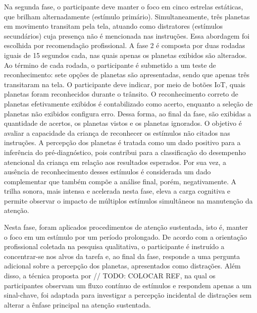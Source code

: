 Na segunda fase, o participante deve manter o foco em cinco estrelas estáticas, que brilham alternadamente (estímulo primário). Simultaneamente, três planetas em movimento transitam pela tela, atuando como distratores (estímulos secundários) cuja presença não é mencionada nas instruções. Essa abordagem foi escolhida por recomendação profissional. A fase 2 é composta por duas rodadas iguais de 15 segundos cada, nas quais apenas os planetas exibidos são alterados. Ao término de cada rodada, o participante é submetido a um teste de reconhecimento: sete opções de planetas são apresentadas, sendo que apenas três transitaram na tela. O participante deve indicar, por meio de botões IoT, quais planetas foram reconhecidos durante o trânsito. O reconhecimento correto de planetas efetivamente exibidos é contabilizado como acerto, enquanto a seleção de planetas não exibidos configura erro. Dessa forma, ao final da fase, são exibidas a quantidade de acertos, os planetas vistos e os planetas ignorados. O objetivo é avaliar a capacidade da criança de reconhecer os estímulos não citados nas instruções. A percepção dos planetas é tratada como um dado positivo para a inferência do pré-diagnóstico, pois contribui para a classificação do desempenho atencional da criança em relação aos resultados esperados. Por sua vez, a ausência de reconhecimento desses estímulos é considerada um dado complementar que também compõe a análise final, porém, negativamente. A trilha sonora, mais intensa e acelerada nesta fase, eleva a carga cognitiva e permite observar o impacto de múltiplos estímulos simultâneos na manutenção da atenção.

Nesta fase, foram aplicados procedimentos de atenção sustentada, isto é, manter o foco em um estímulo por um período prolongado. De acordo com a orientação profissional coletada na pesquisa qualitativa, o participante é instruído a concentrar-se nos alvos da tarefa e, ao final da fase, responde a uma pergunta adicional sobre a percepção dos planetas, apresentados como distrações. Além disso, a técnica proposta por // TODO: COLOCAR REF, na qual os participantes observam um fluxo contínuo de estímulos e respondem apenas a um sinal-chave, foi adaptada para investigar a percepção incidental de distrações sem alterar a ênfase principal na atenção sustentada.

